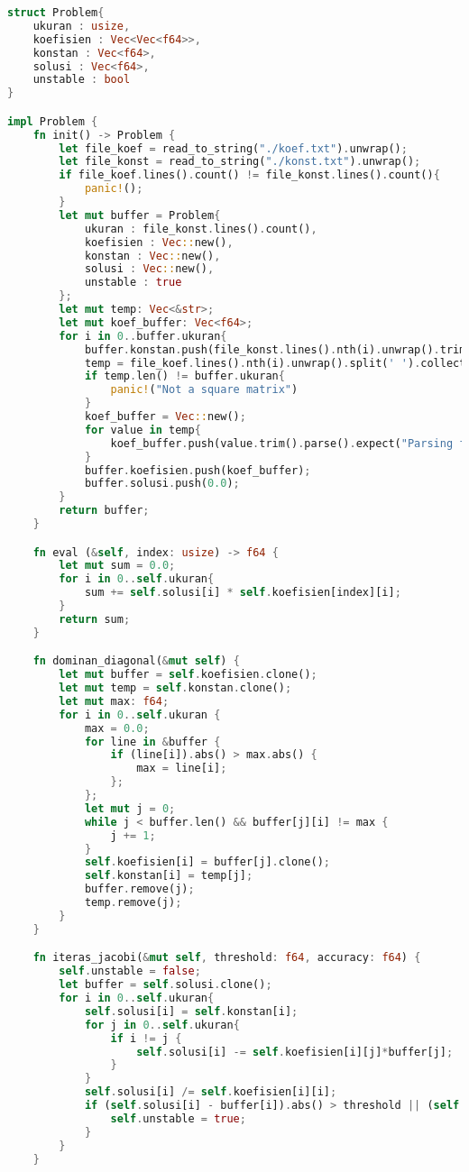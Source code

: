 \documentclass[12pt]{article}
\begin{document}
\begin{enumerate}
{\begin{lstlisting}[language=Rust, style=colouredRust, basicstyle=\fontsize{6.7pt}{8pt}\selectfont\color{white}\ttfamily]
struct Problem{
    ukuran : usize,
    koefisien : Vec<Vec<f64>>,
    konstan : Vec<f64>,
    solusi : Vec<f64>,
    unstable : bool
}

impl Problem {
    fn init() -> Problem {
        let file_koef = read_to_string("./koef.txt").unwrap();
        let file_konst = read_to_string("./konst.txt").unwrap();
        if file_koef.lines().count() != file_konst.lines().count(){
            panic!();
        }
        let mut buffer = Problem{
            ukuran : file_konst.lines().count(),
            koefisien : Vec::new(),
            konstan : Vec::new(),
            solusi : Vec::new(),
            unstable : true
        };
        let mut temp: Vec<&str>;
        let mut koef_buffer: Vec<f64>;
        for i in 0..buffer.ukuran{
            buffer.konstan.push(file_konst.lines().nth(i).unwrap().trim().parse().expect("Parsing failed"));
            temp = file_koef.lines().nth(i).unwrap().split(' ').collect();
            if temp.len() != buffer.ukuran{
                panic!("Not a square matrix")
            }
            koef_buffer = Vec::new();
            for value in temp{
                koef_buffer.push(value.trim().parse().expect("Parsing failed"))
            }
            buffer.koefisien.push(koef_buffer);
            buffer.solusi.push(0.0);
        }
        return buffer;
    }

    fn eval (&self, index: usize) -> f64 {
        let mut sum = 0.0;
        for i in 0..self.ukuran{
            sum += self.solusi[i] * self.koefisien[index][i];
        }
        return sum;
    }

    fn dominan_diagonal(&mut self) {
        let mut buffer = self.koefisien.clone();
        let mut temp = self.konstan.clone();
        let mut max: f64;
        for i in 0..self.ukuran {
            max = 0.0;
            for line in &buffer {
                if (line[i]).abs() > max.abs() {
                    max = line[i];
                };
            };
            let mut j = 0;
            while j < buffer.len() && buffer[j][i] != max {
                j += 1;
            }
            self.koefisien[i] = buffer[j].clone();
            self.konstan[i] = temp[j];
            buffer.remove(j);
            temp.remove(j);
        }
    }

    fn iteras_jacobi(&mut self, threshold: f64, accuracy: f64) {
        self.unstable = false;
        let buffer = self.solusi.clone();
        for i in 0..self.ukuran{
            self.solusi[i] = self.konstan[i];
            for j in 0..self.ukuran{
                if i != j {
                    self.solusi[i] -= self.koefisien[i][j]*buffer[j];
                }
            }
            self.solusi[i] /= self.koefisien[i][i]; 
            if (self.solusi[i] - buffer[i]).abs() > threshold || (self.eval(i) - self.konstan[i]).abs() > accuracy {
                self.unstable = true;
            }
        }
    }


\end{lstlisting}}
\end{enumerate}
\end{document}
